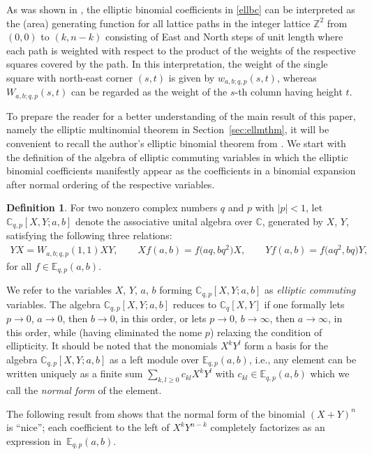 \documentclass[10pt,a4paper]{amsart}
\numberwithin{equation}{section}
\theoremstyle{definition}
\newtheorem{Definition}[Theorem]{Definition}
\newcommand{\C}{\mathbb C}
\newcommand{\E}{\mathbb E}
\newcommand{\Z}{\mathbb Z}
\begin{document}
As was shown in \cite{S1}, the elliptic binomial coefficients
in \eqref{ellbc} can be interpreted as the (area) generating function
for all lattice paths in the integer lattice $\Z^2$ from $(0,0)$ to
$(k,n-k)$ consisting of East and North steps of unit length
where each path is weighted with respect to the product of the
weights of the respective squares covered by the path.
In this interpretation, the weight of the single square with
north-east corner $(s,t)$ is given by $w_{a,b;q,p}(s,t)$,
whereas~$W_{a,b;q,p}(s,t)$ can be regarded as
the weight of the $s$-th column having height $t$.

To prepare the reader for a better understanding of the main result
of this paper, namely the elliptic multinomial theorem in
Section~\ref{sec:ellmthm}, it will be convenient to recall the
author's elliptic binomial theorem from \cite[Theorem~2]{S1}.
We start with the definition of
the algebra of elliptic commuting variables in which the
elliptic binomial coefficients manifestly appear as the
coefficients in a binomial expansion after normal ordering of the
respective variables.

\begin{Definition}\label{defea}
For two nonzero complex numbers $q$ and $p$ with $|p|<1$,
let $\C_{q,p}[X,Y;a,b]$ denote
the associative unital algebra over $\C$,
generated by $X$, $Y$,
satisfying the following three relations:
\begin{align*}
YX=W_{a,b;q,p}(1,1) XY,
\qquad
Xf(a,b)=f\bigl(aq,bq^2\bigr) X,\qquad
Yf(a,b)=f\bigl(aq^2,bq\bigr) Y,
\end{align*}
for all $f\in\E_{q,p}(a,b)$.
\end{Definition}
We refer to the variables $X$, $Y$, $a$, $b$
forming $\C_{q,p}[X,Y;a,b]$
as {\em elliptic commuting} variables.
The algebra $\C_{q,p}[X,Y;a,b]$ reduces to
$\C_{q}[X,Y]$ if one formally lets $p\to 0$, $a\to 0$,
then $b\to 0$, in this order, or lets $p\to 0$, $b\to\infty$,
then $a\to\infty$, in this order, while (having eliminated the nome $p$)
relaxing the condition of ellipticity.
It should be noted that the monomials $X^kY^l$ form a basis for the
algebra $\C_{q,p}[X,Y;a,b]$ as a left module
over $\E_{q,p}(a,b)$,
i.e., any element can be written uniquely as a finite sum
$\sum_{k,l\ge 0} c_{kl}X^kY^l$ with $c_{kl}\in \E_{q,p}(a,b)$
which we call the \textit{normal form} of the element.

The following result from \cite[Theorem~2]{S1}
shows that the normal form of the binomial
${(X+Y)^n}$ is ``nice''; each coefficient to the left of
$X^kY^{n-k}$ completely factorizes as an expression in~$\E_{q,p}(a,b)$.
\end{document}
